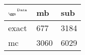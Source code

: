 \begin{tabular}{lll}
    \toprule
    $_{\text{\tiny{\ggn}}}$$^{\text{\tiny{Data}}}$ & mb & sub \\
    \midrule
    exact & 677
              & 3184 \\
    mc   & 3060
              & 6029 \\
    \bottomrule
\end{tabular}